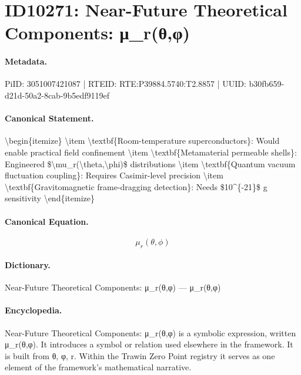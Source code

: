 \section*{ID10271: Near-Future Theoretical Components: μ\_r(θ,φ)}
\paragraph{Metadata.}
PiID: 3051007421087 | RTEID: RTE:P39884.5740:T2.8857 | UUID: b30fb659-d21d-50a2-8cab-9b5edf9119ef

\paragraph{Canonical Statement.}
\textbackslash{}begin\{itemize\} \textbackslash{}item \textbackslash{}textbf\{Room-temperature superconductors\}: Would enable practical field confinement \textbackslash{}item \textbackslash{}textbf\{Metamaterial permeable shells\}: Engineered \$\textbackslash{}mu\_r(\textbackslash{}theta,\textbackslash{}phi)\$ distributions \textbackslash{}item \textbackslash{}textbf\{Quantum vacuum fluctuation coupling\}: Requires Casimir-level precision \textbackslash{}item \textbackslash{}textbf\{Gravitomagnetic frame-dragging detection\}: Needs \$10\textasciicircum{}\{-21\}\$ g sensitivity \textbackslash{}end\{itemize\}

\paragraph{Canonical Equation.}
\[
\mu_r(\theta,\phi)
\]

\paragraph{Dictionary.}
Near-Future Theoretical Components: μ\_r(θ,φ) — μ\_r(θ,φ)

\paragraph{Encyclopedia.}
Near-Future Theoretical Components: μ\_r(θ,φ) is a symbolic expression, written μ\_r(θ,φ). It introduces a symbol or relation used elsewhere in the framework. It is built from θ, φ, r. Within the Trawin Zero Point registry it serves as one element of the framework's mathematical narrative.
